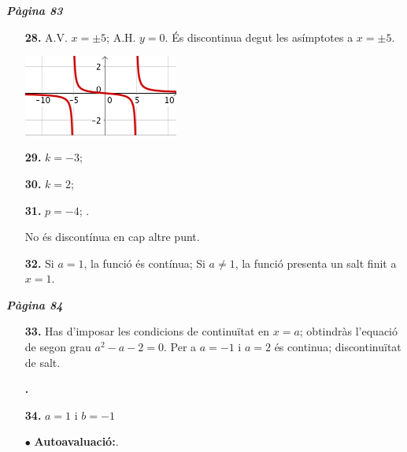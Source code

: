 \documentclass[a4paper, pdf, twoside]{book}
\begin{document}
\begin{multicols}{2}
{\textbf{\em Pàgina 83}} \hrulefill
\begin{enumerate}
\vspace{0.25cm}
\item[\fontfamily{phv}\selectfont\color{blue}\textbf{28. }] 
A.V. $x=\pm 5$; A.H. $y=0$. És discontinua degut les asímptotes a $x=\pm 5$.\par \includegraphics [width=0.4\textwidth ]{img-sol/t6-31} 
 \end{enumerate}
\begin{enumerate}
\vspace{0.25cm}
\item[\fontfamily{phv}\selectfont\color{blue}\textbf{29. }] 
$k=-3$; 
\vspace{0.25cm}
\item[\fontfamily{phv}\selectfont\color{blue}\textbf{30. }] 
$k=2$; 
\vspace{0.25cm}
\item[\fontfamily{phv}\selectfont\color{blue}\textbf{31. }] 
 $p=-4$; .\par No és discontínua en cap altre punt.
\vspace{0.25cm}
\item[\fontfamily{phv}\selectfont\color{blue}\textbf{32. }] 
 Si $a=1$, la funció és contínua; Si $a\neq 1$, la funció presenta un salt finit a $x=1$.  
 \end{enumerate}
\vspace{0.3cm}


{\textbf{\em Pàgina 84}} \hrulefill
\begin{enumerate}
\vspace{0.25cm}
\item[\fontfamily{phv}\selectfont\color{blue}\textbf{33. }]  \scalebox{0.6}{\simbolcompass } 
Has d'imposar les condicions de continuïtat en $x=a$; obtindràs l'equació de segon grau $a^2-a-2=0$. Per a $a=-1$ i $a=2$ és continua; discontinuïtat de salt.
 \end{enumerate}
\begin{enumerate}
\vspace{0.25cm}
\item[\fontfamily{phv}\selectfont\color{blue}\textbf{. }] 
\vspace{0.25cm}
\item[\fontfamily{phv}\selectfont\color{blue}\textbf{34. }] 
$a=1$ i $b=-1$
\vspace{0.25cm}
 \item[$\bullet$ ] {\selectfont\color{blue}\textbf{Autoavaluació:}. }


\end{enumerate}
\end{multicols}
\end{document}
